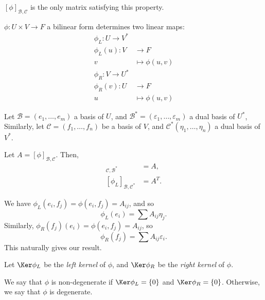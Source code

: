 \documentclass[12pt]{article}
\begin{document}
\begin{remark}
	$[\phi]_{\mathcal{B},\mathcal{C}}$ is the only matrix satisfying this property.
\end{remark}

\begin{definition}
	$\phi: U \times V \to F$ a bilinear form determines two linear maps:
	\begin{align*}
		\phi_L : U \to V^{\ast}& \\
		\phi_L(u) : V &\to F \\
			      v &\mapsto \phi(u, v)\\
			      \phi_R : V \to U^{\ast}& \\
			      \phi_R(v) : U &\to F \\
			      u &\mapsto \phi(u, v)
	\end{align*}
\end{definition}

\begin{lemma}
	Let $\mathcal{B} = (e_1, \ldots, e_m)$ a basis of $U$, and $\mathcal{B}^{\ast} = (\varepsilon_1, \ldots, \varepsilon_m)$ a dual basis of $U^{\ast}$, Similarly, let $\mathcal{C} = (f_1, \ldots, f_n)$ be a basis of $V$, and $\mathcal{C}^{\ast} (\eta_1, \ldots, \eta_n)$ a dual basis of $V^{\ast}$.

	Let $A = [\phi]_{\mathcal{B}, \mathcal{C}}$. Then,
	\begin{align*}
		[\phi_R]_{\mathcal{C}, \mathcal{B}^{\ast}} &= A, \\
		[\phi_L]_{\mathcal{B}, \mathcal{C}^{\ast}} &= A^{T}.
	\end{align*}
\end{lemma}

\begin{proofbox}
	We have $\phi_L(e_i, f_j) = \phi(e_i, f_j) = A_{ij}$, and so
	\[
		\phi_L(e_i) = \sum A_{ij} \eta_j
	.\]
	Similarly, $\phi_R(f_j)(e_i) = \phi(e_i, f_j) = A_{ij}$, so
	\[
		\phi_R(f_{j}) = \sum A_{ij} \varepsilon_i
	.\]
	This naturally gives our result.
\end{proofbox}

\begin{definition}
	Let $\Ker \phi_L$ be the \textit{left kernel} of $\phi$, and $\Ker \phi_R$ be the \textit{right kernel} of $\phi$.

	We say that $\phi$ is non-degenerate if $\Ker \phi_L = \{0\}$ and $\Ker \phi_R = \{0\}$. Otherwise, we say that $\phi$ is degenerate.
\end{definition}
\end{document}
